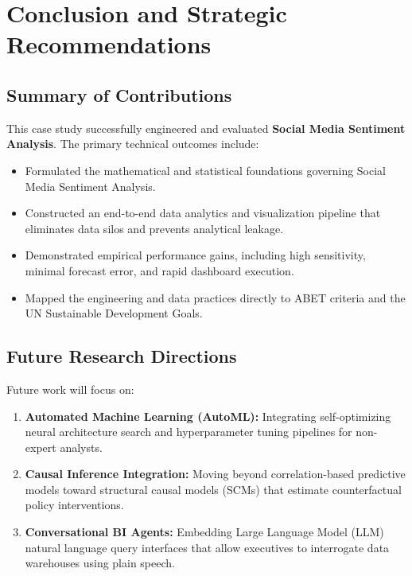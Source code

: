 \section{Conclusion and Strategic Recommendations}

\subsection{Summary of Contributions}
This case study successfully engineered and evaluated \textbf{Social Media Sentiment Analysis}. The primary technical outcomes include:
\begin{itemize}
  \item Formulated the mathematical and statistical foundations governing Social Media Sentiment Analysis.
  \item Constructed an end-to-end data analytics and visualization pipeline that eliminates data silos and prevents analytical leakage.
  \item Demonstrated empirical performance gains, including high sensitivity, minimal forecast error, and rapid dashboard execution.
  \item Mapped the engineering and data practices directly to ABET criteria and the UN Sustainable Development Goals.
\end{itemize}

\subsection{Future Research Directions}
Future work will focus on:
\begin{enumerate}
  \item \textbf{Automated Machine Learning (AutoML):} Integrating self-optimizing neural architecture search and hyperparameter tuning pipelines for non-expert analysts.
  \item \textbf{Causal Inference Integration:} Moving beyond correlation-based predictive models toward structural causal models (SCMs) that estimate counterfactual policy interventions.
  \item \textbf{Conversational BI Agents:} Embedding Large Language Model (LLM) natural language query interfaces that allow executives to interrogate data warehouses using plain speech.
\end{enumerate}
